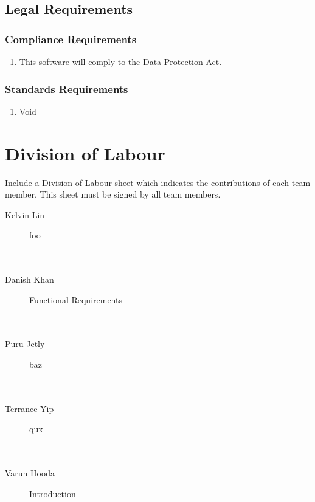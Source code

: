 \documentclass[]{article}
\begin{document}

\subsection{Legal Requirements}
\label{sub:legal_requirements}

\subsubsection{Compliance Requirements}
\label{ssub:compliance_requirements}
\begin{enumerate}[{LR}1. ]
	\item  This software will comply to the Data Protection Act.
\end{enumerate}

\subsubsection{Standards Requirements}
\label{ssub:standards_requirements}
\begin{enumerate}[{LR}1. ]
	\item Void
\end{enumerate}



\newpage

\appendix
\section{Division of Labour}
\label{sec:division_of_labour}
Include a Division of Labour sheet which indicates the contributions of each
team member. This sheet must be signed by all team members.
\begin{description}
  \item [Kelvin Lin] foo
    \\\\\\

  \item [Danish Khan] Functional Requirements
    \\\\\\

  \item [Puru Jetly] baz
    \\\\\\

  \item [Terrance Yip] qux
    \\\\\\

  \item [Varun Hooda] Introduction
\end{description}
\end{document}
